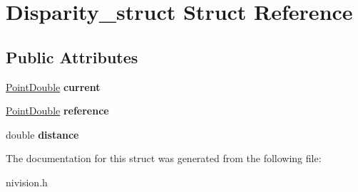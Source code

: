 \hypertarget{structDisparity__struct}{
\section{Disparity\_\-struct Struct Reference}
\label{structDisparity__struct}
}
\subsection*{Public Attributes}
\begin{DoxyCompactItemize}
\item 
\hypertarget{structDisparity__struct_a93620db2d876716fb58f962d90326784}{
\hyperlink{structPointDouble__struct}{PointDouble} {\bfseries current}}
\label{structDisparity__struct_a93620db2d876716fb58f962d90326784}

\item 
\hypertarget{structDisparity__struct_ace5867addc95fd1142061301cc689c6f}{
\hyperlink{structPointDouble__struct}{PointDouble} {\bfseries reference}}
\label{structDisparity__struct_ace5867addc95fd1142061301cc689c6f}

\item 
\hypertarget{structDisparity__struct_a1c65c85b3ef4cf7d10fa667af9be1a1a}{
double {\bfseries distance}}
\label{structDisparity__struct_a1c65c85b3ef4cf7d10fa667af9be1a1a}

\end{DoxyCompactItemize}


The documentation for this struct was generated from the following file:\begin{DoxyCompactItemize}
\item 
nivision.h\end{DoxyCompactItemize}
